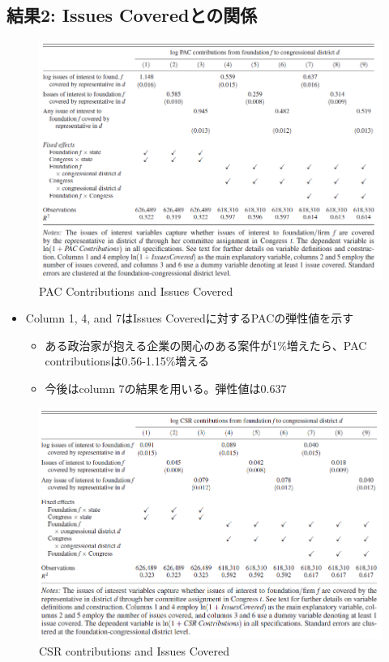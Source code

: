 \documentclass[../root]{subfiles}
\begin{document}
    \subsection{結果2: Issues Coveredとの関係}\label{ux7d50ux679c2-issues-coveredux3068ux306eux95a2ux4fc2}

    \begin{figure}
    \centering
    \includegraphics[width = .8\linewidth]{0911kato/92604588-a2c0c480-f2eb-11ea-8dd4-69d392ca2875.png}
    \caption{PAC Contributions and Issues Covered}
    \end{figure}

    \begin{itemize}
    
    \item
      Column 1, 4, and 7はIssues Coveredに対するPACの弾性値を示す

      \begin{itemize}
      
      \item
        ある政治家が抱える企業の関心のある案件が1\%増えたら、PAC contributionsは0.56-1.15\%増える
      \item
        今後はcolumn 7の結果を用いる。弾性値は0.637
      \end{itemize}
    \end{itemize}

    \begin{figure}
    \centering
    \includegraphics[width = .8\linewidth]{0911kato/92605313-8a9d7500-f2ec-11ea-9695-088e163dd4c6.png}
    \caption{CSR contributions and Issues Covered}
    \end{figure}
\end{document}
